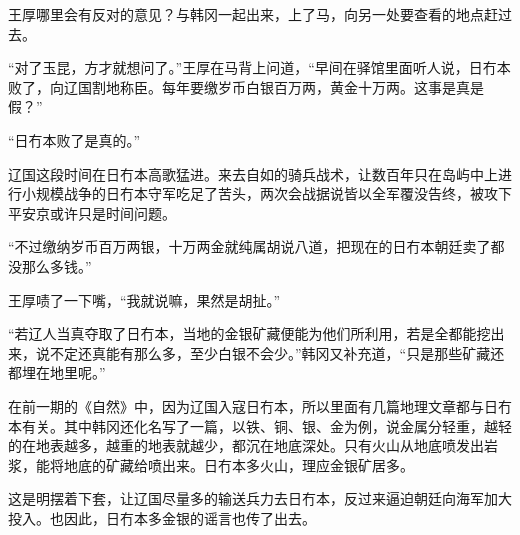 王厚哪里会有反对的意见？与韩冈一起出来，上了马，向另一处要查看的地点赶过去。

“对了玉昆，方才就想问了。”王厚在马背上问道，“早间在驿馆里面听人说，日冇本败了，向辽国割地称臣。每年要缴岁币白银百万两，黄金十万两。这事是真是假？”

“日冇本败了是真的。”

辽国这段时间在日冇本高歌猛进。来去自如的骑兵战术，让数百年只在岛屿中上进行小规模战争的日冇本守军吃足了苦头，两次会战据说皆以全军覆没告终，被攻下平安京或许只是时间问题。

“不过缴纳岁币百万两银，十万两金就纯属胡说八道，把现在的日冇本朝廷卖了都没那么多钱。”

王厚啧了一下嘴，“我就说嘛，果然是胡扯。”

“若辽人当真夺取了日冇本，当地的金银矿藏便能为他们所利用，若是全都能挖出来，说不定还真能有那么多，至少白银不会少。”韩冈又补充道，“只是那些矿藏还都埋在地里呢。”

在前一期的《自然》中，因为辽国入寇日冇本，所以里面有几篇地理文章都与日冇本有关。其中韩冈还化名写了一篇，以铁、铜、银、金为例，说金属分轻重，越轻的在地表越多，越重的地表就越少，都沉在地底深处。只有火山从地底喷发出岩浆，能将地底的矿藏给喷出来。日冇本多火山，理应金银矿居多。

这是明摆着下套，让辽国尽量多的输送兵力去日冇本，反过来逼迫朝廷向海军加大投入。也因此，日冇本多金银的谣言也传了出去。

